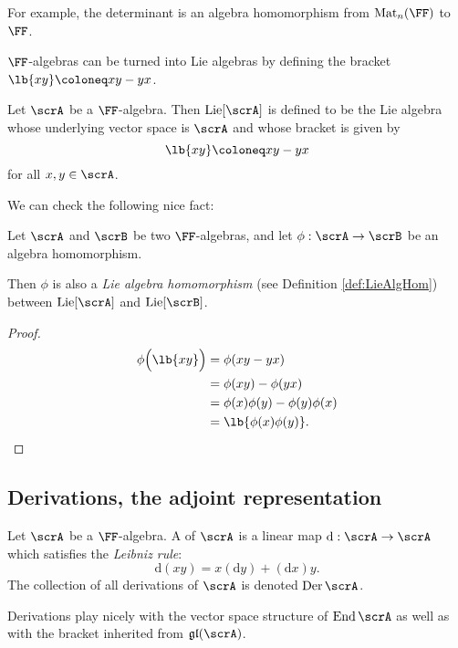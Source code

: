 \documentclass{article}
\DeclarePairedDelimiter\lb\lbrack\rbrack
\DeclareMathOperator{\End}{End}
\DeclareMathOperator{\Mat}{Mat}
\DeclareMathOperator{\Lie}{Lie}
\DeclareMathOperator{\Der}{Der}
\newcommand{\dd}{\ensuremath{\text{d}}}
\newcommand*\gl{\ensuremath{\mathfrak{gl}}}
\begin{document}
For example, the determinant is an algebra homomorphism from $\Mat_n(\FF)$ to $\FF$.

$\FF$-algebras can be turned into Lie algebras by defining the bracket $\lb{xy} \coloneq xy - yx$.

\begin{definition}
    Let $\scrA$ be a $\FF$-algebra.
    Then $\Lie[\scrA]$ is defined to be the Lie algebra whose underlying vector space is $\scrA$ and whose bracket is given by
    \[
        \lb{xy}
        \coloneq
        xy - yx
    \]
    for all $x, y \in \scrA$.
\end{definition}

We can check the following nice fact: 

\begin{proposition}
    Let $\scrA$ and $\scrB$ be two $\FF$-algebras, and let $\phi: \scrA \to \scrB$ be an algebra homomorphism.

    Then $\phi$ is also a \textit{Lie algebra homomorphism} (see Definition \ref{def:LieAlgHom}) between $\Lie[\scrA]$ and $\Lie[\scrB]$.
\end{proposition}
\begin{proof}
    \begin{align*}
        \phi\Big(\lb{xy}\Big)
        &=
        \phi(xy - yx)
        \\
        &=
        \phi(xy) - \phi(yx)
        \\
        &=
        \phi(x)\phi(y) - \phi(y)\phi(x)
        \\
        &=
        \lb{\phi(x)\phi(y)}.
    \end{align*}
\end{proof}

\subsection{Derivations, the adjoint representation}

\begin{definition}
    Let $\scrA$ be a $\FF$-algebra.
    A  of $\scrA$ is a linear map $\dd: \scrA \to \scrA$ which satisfies the \textit{Leibniz rule}:
    \[
        \dd(xy)
        =
        x(\dd y) + (\dd x) y.
    \]
    The collection of all derivations of $\scrA$ is denoted $\Der \scrA$.
\end{definition}

Derivations play nicely with the vector space structure of $\End \scrA$ as well as with the bracket inherited from $\gl(\scrA)$.
\end{document}
